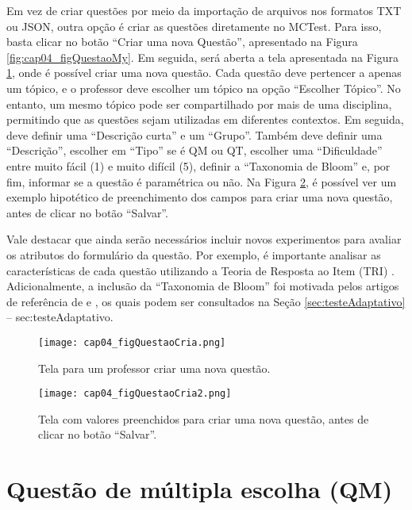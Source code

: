 Em vez de criar questões por meio da importação de arquivos nos formatos TXT ou JSON, outra opção é criar as questões diretamente no MCTest. Para isso, basta clicar no botão ``Criar uma nova Questão'', apresentado na Figura \ref{fig:cap04_figQuestaoMy}. Em seguida, será aberta a tela apresentada na Figura \ref{fig:cap04_figQuestaoCria}, onde é possível criar uma nova questão. Cada questão deve pertencer a apenas um tópico, e o professor deve escolher um tópico na opção ``Escolher Tópico''. No entanto, um mesmo tópico pode ser compartilhado por mais de uma disciplina, permitindo que as questões sejam utilizadas em diferentes contextos. Em seguida, deve definir uma ``Descrição curta'' e um ``Grupo''. Também deve definir uma ``Descrição'', escolher em ``Tipo'' se é QM ou QT, escolher uma ``Dificuldade'' entre muito fácil (1) e muito difícil (5), definir a ``Taxonomia de Bloom'' e, por fim, informar se a questão é paramétrica ou não. Na Figura \ref{fig:cap04_figQuestaoCria2}, é possível ver um exemplo hipotético de preenchimento dos campos para criar uma nova questão, antes de clicar no botão ``Salvar''.

Vale destacar que ainda serão necessários incluir novos experimentos para avaliar os atributos do formulário da questão. Por exemplo, é importante analisar as características de cada questão utilizando a Teoria de Resposta ao Item (TRI) \cite{2021:Zampirolli.Junior.ea,2021:Zampirolli.Batista.ea}. Adicionalmente, a inclusão da ``Taxonomia de Bloom'' foi motivada pelos artigos de referência de  e , os quais podem ser consultados na Seção \ref{sec:testeAdaptativo} -- \refname{sec:testeAdaptativo}.

\begin{figure}[!ht]
  \centering
  \texttt{[image: cap04\_figQuestaoCria.png]}
  \caption{Tela para um professor criar uma nova questão.}
  \label{fig:cap04_figQuestaoCria}
\end{figure}

\begin{figure}[!ht]
  \centering
  \texttt{[image: cap04\_figQuestaoCria2.png]}
  \caption{Tela com valores preenchidos para criar uma nova questão, antes de clicar no botão ``Salvar''.}
  \label{fig:cap04_figQuestaoCria2}
\end{figure}

\section{Questão de múltipla escolha (QM)}\label{sec:questaoQM}

